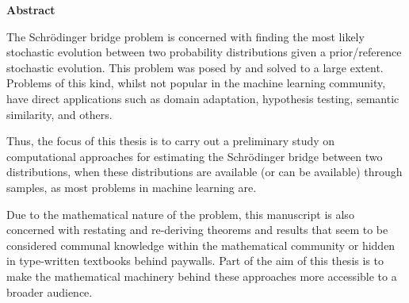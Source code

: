 \newpage
{\Huge \bf Abstract}
\vspace{24pt} 


The Schrödinger bridge problem is concerned with finding the most likely stochastic evolution between two probability distributions given a prior/reference stochastic evolution. This problem was posed by \cite{schrodinger1931uber,schrodinger1932theorie} and solved to a large extent. Problems of this kind, whilst not popular in the machine learning community, have direct applications such as domain adaptation, hypothesis testing, semantic similarity, and others.

Thus, the focus of this thesis is to carry out a preliminary study on computational approaches for estimating the Schrödinger bridge between two distributions, when these distributions are available (or can be available) through samples, as most problems in machine learning are.

Due to the mathematical nature of the problem, this manuscript is also concerned with restating and re-deriving theorems and results that seem to be considered communal knowledge within the mathematical community or hidden in type-written textbooks behind paywalls. Part of the aim of this thesis is to make the mathematical machinery behind these approaches more accessible to a broader audience.

\newpage
\vspace*{\fill}
